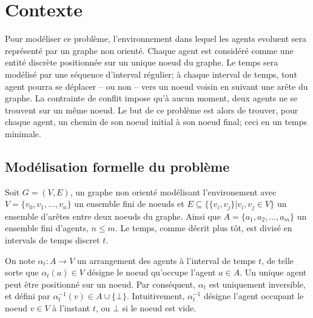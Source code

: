 \documentclass[french, 12pt, letterpaper]{article}
\theoremstyle{definition}
\theoremstyle{proposition}
\theoremstyle{example}
\begin{document}
    \newpage
    \section{Contexte}

    Pour modéliser ce problème, l'environnement dans lequel les agents evoluent sera représenté par un graphe non orienté. 
    Chaque agent est considéré comme une entité discrète positionnée sur un unique noeud du graphe.
    Le temps sera modélisé par une séquence d'interval régulier; à chaque interval de temps, 
    tout agent pourra se déplacer -- ou non -- vers un noeud voisin en suivant une arête du graphe.
    La contrainte de conflit impose qu'à aucun moment, deux agents ne se trouvent sur un même noeud.
    Le but de ce problème est alors de trouver, pour chaque agent, un chemin de son noeud initial à son noeud final;
    ceci en un temps minimale. 

    \subsection{Modélisation formelle du problème}

    Soit $G = ( V, E )$, un graphe non orienté modélisant l'environement avec $V = \{v_0, v_1, \dots, v_n\}$ un ensemble fini de noeuds et 
    $E \subseteq \{\{v_i, v_j\}|v_i, v_j \in V\}$ un ensemble d'arêtes entre deux noeuds du graphe. 
    Ainsi que $A = \{a_1, a_2, \ldots, a_m\}$ un ensemble fini d'agents, $n \leq m$. 
    Le temps, comme décrit plus tôt, est divisé en intervals de temps discret $t$.

    On note $\alpha_t : A \rightarrow V$ un arrangement des agents à l'interval de temps $t$, 
    de telle sorte que $\alpha_t(a)\in V$ désigne le noeud qu'occupe l'agent $a \in A$. 
    Un unique agent peut être positionné sur un noeud.
    Par conséquent, $\alpha_t$ est uniquement inversible, et défini par $\alpha^{-1}_t(v) \in A \cup \{\bot\}$.
    Intuitivement, $\alpha^{-1}_t$ désigne l'agent occupant le noeud $v \in V$ à l'instant $t$, ou $\bot$ si le noeud est vide.
\end{document}
